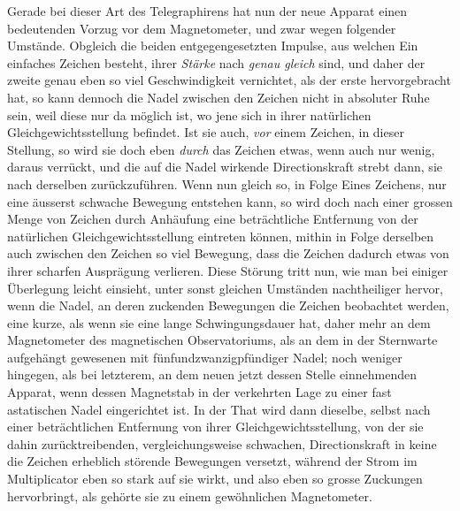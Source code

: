 Gerade bei dieser Art des Telegraphirens hat nun der neue Apparat einen bedeutenden Vorzug vor dem Magnetometer, und zwar wegen folgender Umstände. Obgleich die beiden entgegengesetzten Impulse, aus welchen Ein einfaches Zeichen besteht, ihrer \textit{Stärke} nach \textit{genau gleich} sind, und daher der zweite genau eben so viel Geschwindigkeit vernichtet, als der erste hervorgebracht hat, so kann dennoch die Nadel zwischen den Zeichen nicht in absoluter Ruhe sein, weil diese nur da möglich ist, wo jene sich in ihrer natürlichen Gleichgewichtsstellung befindet. Ist sie auch, \textit{vor} einem Zeichen, in dieser Stellung, so wird sie doch eben \textit{durch} das Zeichen etwas, wenn auch nur wenig, daraus verrückt, und die auf die Nadel wirkende Directionskraft strebt dann, sie nach derselben zurückzuführen. Wenn nun gleich so, in Folge Eines Zeichens, nur eine äusserst
schwache Bewegung entstehen kann, so wird doch nach einer grossen Menge von Zeichen durch Anhäufung eine beträchtliche Entfernung von der natürlichen Gleichgewichtsstellung eintreten können, mithin in Folge derselben auch zwischen den Zeichen so viel Bewegung, dass die Zeichen dadurch etwas von ihrer scharfen Ausprägung verlieren. Diese Störung tritt nun, wie man bei einiger Überlegung leicht einsieht, unter sonst gleichen Umständen nachtheiliger hervor, wenn die Nadel, an deren zuckenden Bewegungen die Zeichen beobachtet werden, eine kurze, als wenn sie eine lange Schwingungsdauer hat, daher mehr an dem Magnetometer des magnetischen Observatoriums, als an dem in der Sternwarte aufgehängt gewesenen mit fünfundzwanzigpfündiger Nadel; noch weniger hingegen, als bei letzterem, an dem neuen jetzt dessen Stelle einnehmenden Apparat, wenn dessen Magnetstab in der verkehrten Lage zu einer fast astatischen Nadel eingerichtet ist. In der That wird dann dieselbe, selbst nach einer beträchtlichen Entfernung von ihrer Gleichgewichtsstellung, von der sie dahin zurücktreibenden, vergleichungsweise schwachen, Directionskraft in keine die Zeichen erheblich störende Bewegungen versetzt, während der Strom im Multiplicator eben so stark auf sie wirkt, und also eben so grosse Zuckungen hervorbringt, als gehörte sie zu einem gewöhnlichen Magnetometer.


